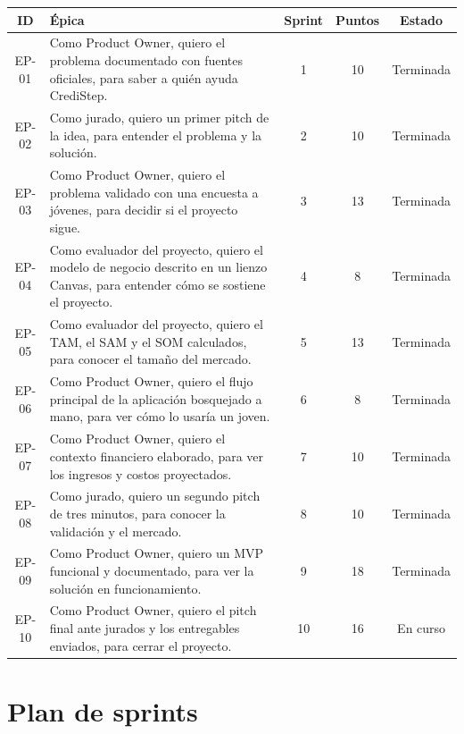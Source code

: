 \documentclass[11pt,a4paper]{article}
\begin{document}
\begin{tabularx}{\textwidth}{c X c c c}
  \toprule
  \textbf{ID} & \textbf{Épica} & \textbf{Sprint} & \textbf{Puntos} & \textbf{Estado} \\
  \midrule
  EP-01 & Como Product Owner, quiero el problema documentado con fuentes oficiales, para saber a quién ayuda CrediStep. & 1 & 10 & Terminada \\
  EP-02 & Como jurado, quiero un primer pitch de la idea, para entender el problema y la solución. & 2 & 10 & Terminada \\
  EP-03 & Como Product Owner, quiero el problema validado con una encuesta a jóvenes, para decidir si el proyecto sigue. & 3 & 13 & Terminada \\
  EP-04 & Como evaluador del proyecto, quiero el modelo de negocio descrito en un lienzo Canvas, para entender cómo se sostiene el proyecto. & 4 & 8 & Terminada \\
  EP-05 & Como evaluador del proyecto, quiero el TAM, el SAM y el SOM calculados, para conocer el tamaño del mercado. & 5 & 13 & Terminada \\
  EP-06 & Como Product Owner, quiero el flujo principal de la aplicación bosquejado a mano, para ver cómo lo usaría un joven. & 6 & 8 & Terminada \\
  EP-07 & Como Product Owner, quiero el contexto financiero elaborado, para ver los ingresos y costos proyectados. & 7 & 10 & Terminada \\
  EP-08 & Como jurado, quiero un segundo pitch de tres minutos, para conocer la validación y el mercado. & 8 & 10 & Terminada \\
  EP-09 & Como Product Owner, quiero un MVP funcional y documentado, para ver la solución en funcionamiento. & 9 & 18 & Terminada \\
  EP-10 & Como Product Owner, quiero el pitch final ante jurados y los entregables enviados, para cerrar el proyecto. & 10 & 16 & En curso \\
  \bottomrule
\end{tabularx}

\section{Plan de sprints}
\end{document}

